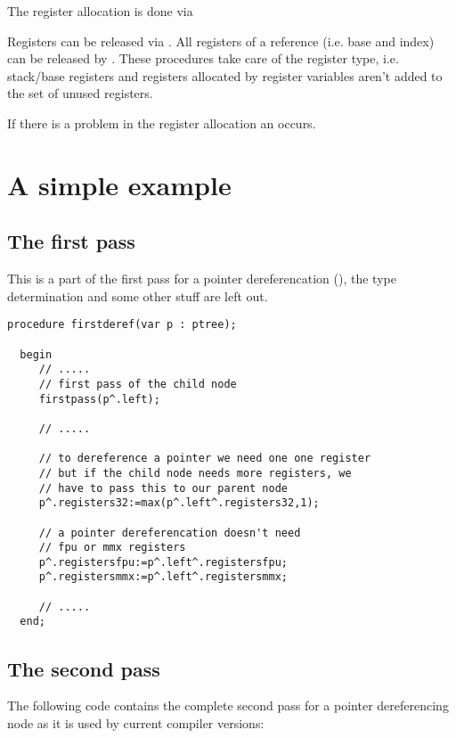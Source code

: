 \documentclass{report}
\begin{document}
The register allocation is done via 

Registers can be released via . All registers
of a reference (i.e. base and index) can be released by
. These procedures take care of the register type,
i.e. stack/base registers and registers allocated by register
variables aren't added to the set of unused registers.

If there is a problem in the register allocation an 
occurs.

\section{A simple example}

\subsection{The first pass}

This is a part of the first pass for a pointer dereferencation
(), the type determination and some other stuff are left out.

\begin{verbatim}
procedure firstderef(var p : ptree);

  begin
     // .....
     // first pass of the child node
     firstpass(p^.left);

     // .....

     // to dereference a pointer we need one one register
     // but if the child node needs more registers, we
     // have to pass this to our parent node
     p^.registers32:=max(p^.left^.registers32,1);

     // a pointer dereferencation doesn't need
     // fpu or mmx registers
     p^.registersfpu:=p^.left^.registersfpu;
     p^.registersmmx:=p^.left^.registersmmx;

     // .....
  end;
\end{verbatim}

\subsection{The second pass}

The following code contains the complete second pass for
a pointer dereferencing node as it is used by current
compiler versions:
\end{document}
